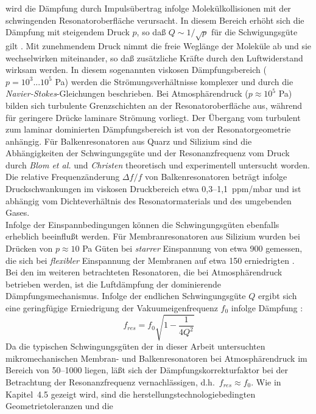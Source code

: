 wird die Dämpfung durch
Impulsübertrag infolge Molekülkollisionen mit der schwingenden
Resonatoroberfläche verursacht. In diesem Bereich erhöht sich die Dämpfung
mit steigendem Druck $p$, so daß $Q \sim 1/\sqrt{p}$ für die Schwigungsgüte
gilt \cite{Blo92}. Mit zunehmendem Druck nimmt die freie Weglänge der
Moleküle ab und sie wechselwirken miteinander, so daß zusätzliche Kräfte
durch den Luftwiderstand wirksam werden. In diesem sogenannten viskosen
Dämpfungsbereich ($p=10^3...10^5$ Pa) werden die Strömungsverhältnisse
komplexer und durch die {\sl Navier-Stokes}-Gleichungen beschrieben. Bei
Atmosphärendruck ($p \approx 10^5$ Pa) bilden sich turbulente
Grenzschichten an der Resonatoroberfläche aus, während für geringere Drücke
laminare Strömung vorliegt. Der Übergang vom turbulent zum laminar
dominierten Dämpfungsbereich ist von der Resonatorgeometrie anhängig.
Für Balkenresonatoren aus Quarz und Silizium sind die Abhängigkeiten
der Schwingungsgüte und der Resonanzfrequenz vom Druck durch
{\sl Blom et al.} \cite{Blo92} und {\sl Christen} \cite{Chr83}
theoretisch und experimentell untersucht worden. Die relative
Frequenzänderung $\Delta f / f$ von Balkenresonatoren beträgt infolge
Druckschwankungen im viskosen Druckbereich etwa 0,3--1,1~ppm/mbar
\cite{Bus94, Chr83} und ist abhängig vom Dichteverhältnis des
Resonatormaterials und des umgebenden Gases.\\
Infolge der Einspannbedingungen können die Schwingungsgüten ebenfalls
erheblich beeinflußt werden. Für Membranresonatoren aus Silizium wurden
bei Drücken von $p \approx 10$ Pa Güten bei {\em starrer} Einspannung von
etwa 900 gemessen, die sich bei {\em flexibler} Einspannung der Membranen
auf etwa 150 erniedrigten \cite{Pra91}.\\
Bei den im weiteren betrachteten Resonatoren, die bei Atmosphärendruck
betrieben werden, ist die Luftdämpfung der dominierende Dämpfungsmechanismus.
Infolge der endlichen Schwingungsgüte $Q$ ergibt sich eine geringfügige
Erniedrigung der Vakuumeigenfrequenz $f_{0}$ infolge Dämpfung \cite{Pet79}:
\begin{equation}
\label{qpetersen}
 f_{res} = f_{0} \sqrt{1 - \frac{1}{4Q^{2}} }
\end{equation}
Da die typischen Schwingungsgüten der in dieser Arbeit untersuchten
mikromechanischen Membran- und Balkenresonatoren bei Atmosphärendruck
im Bereich von 50--1000 liegen, läßt sich der Dämpfungskorrekturfaktor
bei der Betrachtung der Resonanzfrequenz vernachlässigen, d.h.\
$f_{res} \approx f_{0}$.  Wie in Kapitel~4.5 gezeigt wird,
sind die herstellungstechnologiebedingten Geometrietoleranzen und die
